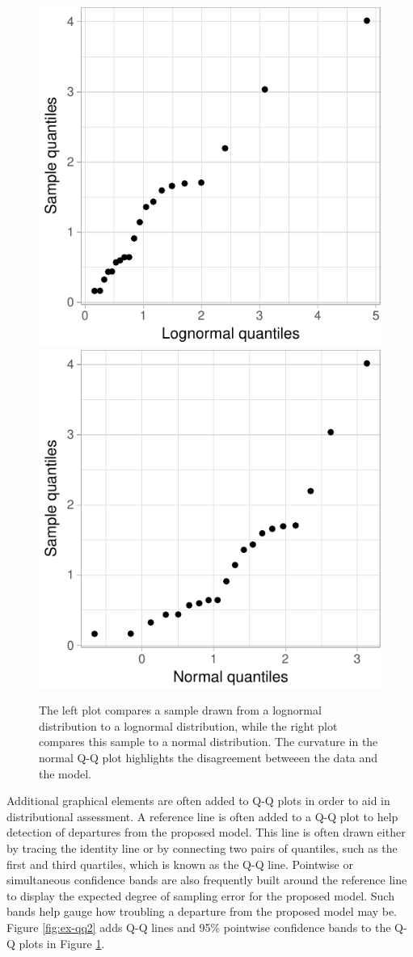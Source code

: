 \begin{Schunk}
\begin{figure}

{\centering \includegraphics[width=0.4\linewidth]{loy-figures/ex-qq1-1} \includegraphics[width=0.4\linewidth]{loy-figures/ex-qq1-2} 

}

\caption[The left plot compares a sample drawn from a lognormal distribution to a lognormal distribution, while the right plot compares this sample to a normal distribution]{The left plot compares a sample drawn from a lognormal distribution to a lognormal distribution, while the right plot compares this sample to a normal distribution. The curvature in the normal Q-Q plot highlights the disagreement betweeen the data and the model.}\label{fig:ex-qq1}
\end{figure}
\end{Schunk}

Additional graphical elements are often added to Q-Q plots in order to
aid in distributional assessment. A reference line is often added to a
Q-Q plot to help detection of departures from the proposed model. This
line is often drawn either by tracing the identity line or by connecting
two pairs of quantiles, such as the first and third quartiles, which is
known as the Q-Q line. Pointwise or simultaneous confidence bands are
also frequently built around the reference line to display the expected
degree of sampling error for the proposed model. Such bands help gauge
how troubling a departure from the proposed model may be. Figure
\ref{fig:ex-qq2} adds Q-Q lines and 95\% pointwise confidence bands to
the Q-Q plots in Figure \ref{fig:ex-qq1}.

